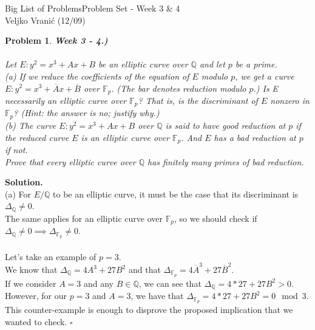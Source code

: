 \documentclass[12pt]{article}
\newtheorem{problem}{Problem}
\newenvironment{solution}[1][\textbf{Solution}]{\textbf{#1.} }{$\square$}
\begin{document}
\noindent Big List of Problems\hfill Problem Set - Week 3 \& 4\\
Veljko Vranić (12/09)

\hrulefill


\begin{problem} \textbf{Week 3 - 4.)} \\ \\
Let $E: y^2 = x^3 + Ax + B$ be an elliptic curve over $\mathbb{Q}$ and let $p$ be a prime. \\

(a) If we reduce the coefficients of the equation of $E$ modulo $p$, we get a curve $E: y^2 = x^3 +\overline{A}x +\overline{B}$ over $\mathbb{F}_p$. (The bar denotes reduction modulo $p$.) Is E necessarily an
elliptic curve over $\mathbb{F}_p$? That is, is the discriminant of $E$ nonzero in $\mathbb{F}_p$? (Hint: the
answer is no; justify why.)  \\
(b) The curve $E: y^2 = x^3 + Ax + B$ over $\mathbb{Q}$ is said to have good reduction at $p$ if the reduced curve $E$ is an elliptic curve over $\mathbb{F}_p$. And $E$ has a bad reduction at $p$ if not. \\
Prove that every elliptic curve over $\mathbb{Q}$ has finitely many primes of bad reduction.
\end{problem}

\begin{solution}\\

(a) For $E/\mathbb{Q}$ to be an elliptic curve, it must be the case that its discriminant is $\Delta_{\mathbb{Q}} \neq 0$. \\ 
The same applies for an elliptic curve over $\mathbb{F}_p$, so we should check if $\Delta_{\mathbb{Q}} \neq 0 \implies \Delta_{\mathbb{F}_p} \neq 0$. \\ \\
Let's take an example of $p = 3$. \\
We know that $\Delta_{\mathbb{Q}} = 4A^3 + 27B^2$ and that $\Delta_{\mathbb{F}_p} = 4\overline{A}^3 + 27 \overline{B}^2$. \\
If we consider $A=3$ and any $B \in \mathbb{Q}$, we can see that $\Delta_{\mathbb{Q}} = 4 * 27 + 27B^2 > 0$. \\
However, for our $p=3$ and $A=3$, we have that  $\Delta_{\mathbb{F}_p} = 4 * 27 + 27B^2 = 0 \mod 3$. \\
This counter-example is enough to disprove the proposed implication that we wanted to check.
\end{solution} 
\end{document}
